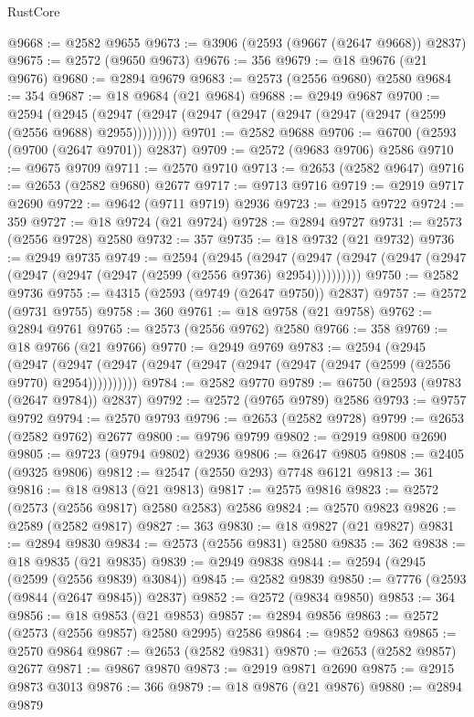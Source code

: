 \begin{lexlean}{RustCore}
\begin{coremodule}
@9668 := @2582 @9655
@9673 := @3906 (@2593 (@9667 (@2647 @9668)) @2837)
@9675 := @2572 (@9650 @9673)
@9676 := 356
@9679 := @18 @9676 (@21 @9676)
@9680 := @2894 @9679
@9683 := @2573 (@2556 @9680) @2580
@9684 := 354
@9687 := @18 @9684 (@21 @9684)
@9688 := @2949 @9687
@9700 := @2594
    (@2945 (@2947 (@2947 (@2947 (@2947 (@2947 (@2947 (@2947 (@2599 (@2556 @9688) @2955)))))))))
@9701 := @2582 @9688
@9706 := @6700 (@2593 (@9700 (@2647 @9701)) @2837)
@9709 := @2572 (@9683 @9706) @2586
@9710 := @9675 @9709
@9711 := @2570 @9710
@9713 := @2653 (@2582 @9647)
@9716 := @2653 (@2582 @9680) @2677
@9717 := @9713 @9716
@9719 := @2919 @9717 @2690
@9722 := @9642 (@9711 @9719) @2936
@9723 := @2915 @9722
@9724 := 359
@9727 := @18 @9724 (@21 @9724)
@9728 := @2894 @9727
@9731 := @2573 (@2556 @9728) @2580
@9732 := 357
@9735 := @18 @9732 (@21 @9732)
@9736 := @2949 @9735
@9749 := @2594
    (@2945
      (@2947 (@2947 (@2947 (@2947 (@2947 (@2947 (@2947 (@2947 (@2599 (@2556 @9736) @2954))))))))))
@9750 := @2582 @9736
@9755 := @4315 (@2593 (@9749 (@2647 @9750)) @2837)
@9757 := @2572 (@9731 @9755)
@9758 := 360
@9761 := @18 @9758 (@21 @9758)
@9762 := @2894 @9761
@9765 := @2573 (@2556 @9762) @2580
@9766 := 358
@9769 := @18 @9766 (@21 @9766)
@9770 := @2949 @9769
@9783 := @2594
    (@2945
      (@2947 (@2947 (@2947 (@2947 (@2947 (@2947 (@2947 (@2947 (@2599 (@2556 @9770) @2954))))))))))
@9784 := @2582 @9770
@9789 := @6750 (@2593 (@9783 (@2647 @9784)) @2837)
@9792 := @2572 (@9765 @9789) @2586
@9793 := @9757 @9792
@9794 := @2570 @9793
@9796 := @2653 (@2582 @9728)
@9799 := @2653 (@2582 @9762) @2677
@9800 := @9796 @9799
@9802 := @2919 @9800 @2690
@9805 := @9723 (@9794 @9802) @2936
@9806 := @2647 @9805
@9808 := @2405 (@9325 @9806)
@9812 := @2547 (@2550 @293) @7748 @6121
@9813 := 361
@9816 := @18 @9813 (@21 @9813)
@9817 := @2575 @9816
@9823 := @2572 (@2573 (@2556 @9817) @2580 @2583) @2586
@9824 := @2570 @9823
@9826 := @2589 (@2582 @9817)
@9827 := 363
@9830 := @18 @9827 (@21 @9827)
@9831 := @2894 @9830
@9834 := @2573 (@2556 @9831) @2580
@9835 := 362
@9838 := @18 @9835 (@21 @9835)
@9839 := @2949 @9838
@9844 := @2594 (@2945 (@2599 (@2556 @9839) @3084))
@9845 := @2582 @9839
@9850 := @7776 (@2593 (@9844 (@2647 @9845)) @2837)
@9852 := @2572 (@9834 @9850)
@9853 := 364
@9856 := @18 @9853 (@21 @9853)
@9857 := @2894 @9856
@9863 := @2572 (@2573 (@2556 @9857) @2580 @2995) @2586
@9864 := @9852 @9863
@9865 := @2570 @9864
@9867 := @2653 (@2582 @9831)
@9870 := @2653 (@2582 @9857) @2677
@9871 := @9867 @9870
@9873 := @2919 @9871 @2690
@9875 := @2915 @9873 @3013
@9876 := 366
@9879 := @18 @9876 (@21 @9876)
@9880 := @2894 @9879

\end{coremodule}
\end{lexlean}
